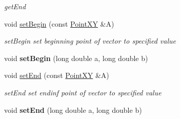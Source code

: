\begin{DoxyCompactItemize}
\begin{DoxyCompactList}\small\item\em get\+End \end{DoxyCompactList}\item 
void \hyperlink{classVectorXY_a54d01726e2920265ddc17152d292ad3e}{set\+Begin} (const \hyperlink{classPointXY}{Point\+X\+Y} \&A)
\begin{DoxyCompactList}\small\item\em set\+Begin set beginning point of vector to specified value \end{DoxyCompactList}\item 
\hypertarget{classVectorXY_ab72566580ee7cfbd9dae6c9b89ba1245}{}void {\bfseries set\+Begin} (long double a, long double b)\label{classVectorXY_ab72566580ee7cfbd9dae6c9b89ba1245}

\item 
void \hyperlink{classVectorXY_a4aa9560ca31838238992c604f23c1910}{set\+End} (const \hyperlink{classPointXY}{Point\+X\+Y} \&A)
\begin{DoxyCompactList}\small\item\em set\+End set endinf point of vector to specified value \end{DoxyCompactList}\item 
\hypertarget{classVectorXY_a808bcf64655761e98f92e915ba6bd634}{}void {\bfseries set\+End} (long double a, long double b)\label{classVectorXY_a808bcf64655761e98f92e915ba6bd634}


\end{DoxyCompactItemize}

